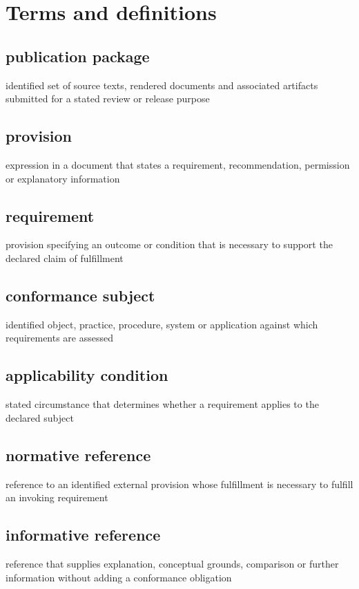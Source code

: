 \documentclass[11pt,a4paper]{article}
\begin{document}
\section{Terms and definitions}
\subsection{publication package}
identified set of source texts, rendered documents and associated artifacts submitted for a stated review or release purpose

\subsection{provision}
expression in a document that states a requirement, recommendation, permission or explanatory information

\subsection{requirement}
provision specifying an outcome or condition that is necessary to support the declared claim of fulfillment

\subsection{conformance subject}
identified object, practice, procedure, system or application against which requirements are assessed

\subsection{applicability condition}
stated circumstance that determines whether a requirement applies to the declared subject

\subsection{normative reference}
reference to an identified external provision whose fulfillment is necessary to fulfill an invoking requirement

\subsection{informative reference}
reference that supplies explanation, conceptual grounds, comparison or further information without adding a conformance obligation
\end{document}
